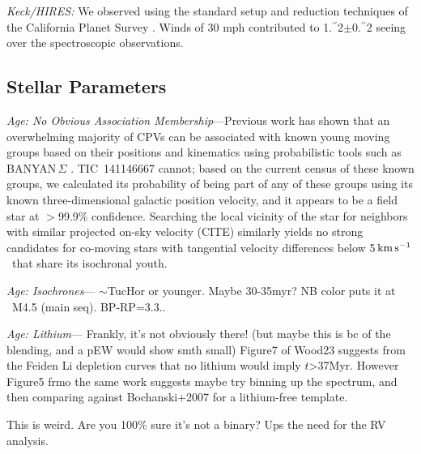 \documentclass{nature3}
\newcommand{\farcs}{\mbox{\ensuremath{.\!\!^{\prime\prime}}}}%
\newcommand{\kms}{\ensuremath{\rm km\,s^{-1}}}
\begin{document}
\begin{methods}
{\it Keck/HIRES:}
We observed using the standard setup and reduction techniques of the
California Planet Survey \cite{Howard2010}.
Winds of 30 mph contributed to
1\farcs2$\pm$0\farcs2 seeing over the spectroscopic observations.  

\subsection{Stellar Parameters}
{\it Age: No Obvious Association Membership}---Previous work
  \cite{Bouma2024} has shown that an overwhelming majority of CPVs can
  be associated with known young moving groups based on their
  positions and kinematics using probabilistic tools such as
  BANYAN\,$\Sigma$ \cite[v1.2;][]{Gagne2018}.  TIC~141146667 cannot;
  based on the current census of these known groups, we calculated its
  probability of being part of any of these groups using its known
  three-dimensional galactic position velocity, and it appears to be a
  field star at $>$99.9\% confidence.  Searching the local vicinity of
  the star for neighbors with similar projected on-sky velocity (CITE)
  similarly yields no strong candidates for co-moving stars with
  tangential velocity differences below 5\,\kms\ that share its
  isochronal youth.

{\it Age: Isochrones}--- $\sim$TucHor or younger.  Maybe 30-35myr?  NB
  color puts it at ~M4.5 (main seq).  BP-RP=3.3..

{\it Age: Lithium}--- Frankly, it's not obviously there!  (but maybe
this is bc of the blending, and a pEW would show smth small)
Figure7 of Wood23 suggests from the Feiden Li depletion curves that no lithium would imply $t$>37Myr.
However Figure5 frmo the same work suggests maybe try binning up the spectrum, and then comparing against Bochanski+2007 for a lithium-free template.

This is weird.  Are you 100\% sure it's not a binary?  Ups the need for
the RV analysis.




\end{methods}
\end{document}

